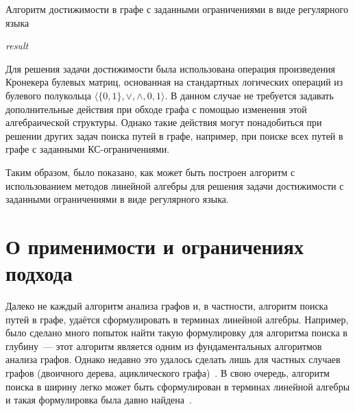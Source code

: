 \begin{algorithm}
\begin{algorithmic}[1]
\caption{Алгоритм достижимости в графе с заданными ограничениями в виде регулярного языка}
\label{lst:fsa_intersection}
    \EndIf
    \EndFor
    \State \Return \textit{result}
\EndFunction
\end{algorithmic}
\end{algorithm}

Для решения задачи достижимости была использована операция произведения Кронекера булевых матриц, основанная на стандартных логических операций из булевого полукольца $\langle \{0, 1\}, \vee, \wedge, 0, 1\rangle$. В данном случае не требуется задавать дополнительные действия при обходе графа с помощью изменения этой алгебраической структуры. Однако такие действия могут понадобиться при решении других задач поиска путей в графе, например, при поиске всех путей в графе с заданными КС-ограничениями.

Таким образом, было показано, как может быть построен алгоритм с использованием методов линейной алгебры для решения задачи достижимости с заданными ограничениями в виде регулярного языка.

\section{О применимости и ограничениях подхода}
Далеко не каждый алгоритм анализа графов и, в частности, алгоритм поиска путей в графе, удаётся сформулировать в терминах линейной алгебры. Например, было сделано много попыток найти такую формулировку для алгоритма поиска в глубину~--- этот алгоритм является  одним из фундаментальных алгоритмов анализа графов. Однако недавно это удалось сделать лишь для частных случаев графов (двоичного дерева, ациклического графа)~\cite{spampinato2019linear}. В свою очередь, алгоритм поиска в ширину легко может быть сформулирован в терминах линейной алгебры и такая формулировка была давно найдена~\cite{kepner2011graph}. 

